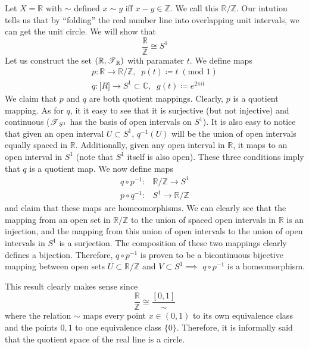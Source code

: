   \begin{example}
    Let $X = \mathbb{R}$ with $\sim$ defined $x \sim y$ iff $x - y \in \mathbb{Z}$. We call this $\mathbb{R}/\mathbb{Z}$. Our intution tells us that by ``folding'' the real number line into overlapping unit intervals, we can get the unit circle. We will show that
    \begin{equation}
      \frac{\mathbb{R}}{\mathbb{Z}} \cong S^1
    \end{equation}
    Let us construct the set $(\mathbb{R}, \operatorname{\mathscr{T}}_{\mathbb{R}})$ with paramater $t$. We define maps
    \begin{align*}
      p: \mathbb{R} \rightarrow \mathbb{R} / \mathbb{Z}, \;\; p(t) \coloneqq t \; (\text{mod } 1) \\
      q: \mathbb[R] \rightarrow S^1 \subset \mathbb{C}, \;\; g(t) \coloneqq e^{2 \pi i t} 
    \end{align*}
    We claim that $p$ and $q$ are both quotient mappings. Clearly, $p$ is a quotient mapping. As for $q$, it it easy to see that it is surjective (but not injective) and continuous ($\operatorname{\mathscr{T}}_{S^1}$ has the basis of open intervals on $S^1$). It is also easy to notice that given an open interval $U \subset S^1$, $q^{-1}(U)$ will be the union of open intervals equally spaced in $\mathbb{R}$. Additionally, given any open interval in $\mathbb{R}$, it maps to an open interval in $S^1$ (note that $S^1$ itself is also open). These three conditions imply that $q$ is a quotient map. We now define maps 
    \begin{align}
      q \circ p^{-1}: & \mathbb{R} / \mathbb{Z} \rightarrow S^1 \\
      p \circ q^{-1}: & S^1 \rightarrow \mathbb{R} / \mathbb{Z}
    \end{align}
    and claim that these maps are homeomorphisms. We can clearly see that the mapping from an open set in $\mathbb{R} / \mathbb{Z}$ to the union of spaced open intervals in $\mathbb{R}$ is an injection, and the mapping from this union of open intervals to the union of open intervals in $S^1$ is a surjection. The composition of these two mappings clearly defines a bijection. Therefore, $q \circ p^{-1}$ is proven to be a bicontinuous bijective mapping between open sets $U \subset \mathbb{R} / \mathbb{Z}$ and $V \subset S^1 \implies$ $q \circ p^{-1}$ is a homeomorphism. 

    This result clearly makes sense since 
    \begin{equation}
      \frac{\mathbb{R}}{\mathbb{Z}} \cong \frac{[0,1]}{\sim}
    \end{equation}
    where the relation $\sim$ maps every point $x \in (0,1)$ to its own equivalence class and the points $0, 1$ to one equivalence class $\{0\}$. Therefore, it is informally said that the quotient space of the real line is a circle. 


\end{example}

